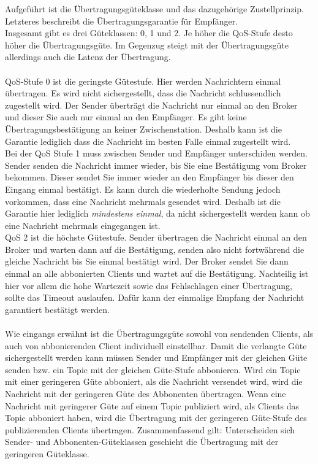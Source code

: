 \documentclass[11pt,a4paper]{report}
\begin{document}
Aufgeführt ist die Übertragungsgüteklasse und das dazugehörige Zustellprinzip.
Letzteres beschreibt die Übertragungsgarantie für Empfänger.
\\
Insgesamt gibt es drei Güteklassen: 0, 1 und 2.
Je höher die QoS-Stufe desto höher die Übertragungsgüte.
Im Gegenzug steigt mit der Übertragungsgüte allerdings auch die Latenz der Übertragung.
\\\\
QoS-Stufe 0 ist die geringste Gütestufe.
Hier werden Nachrichtern einmal übertragen.
Es wird nicht sichergestellt, dass die Nachricht schlussendlich zugestellt wird. 
Der Sender überträgt die Nachricht nur einmal an den Broker und dieser Sie auch nur einmal an den Empfänger.
Es gibt keine Übertragungsbestätigung an keiner Zwischenstation.
Deshalb kann ist die Garantie lediglich dass die Nachricht im besten Falle einmal zugestellt wird.
\\
Bei der QoS Stufe 1 muss zwischen Sender und Empfänger unterschiden werden.
Sender senden die Nachricht immer wieder, bis Sie eine Bestätigung vom Broker bekommen.
Dieser sendet Sie immer wieder an den Empfänger bis dieser den Eingang einmal bestätigt.
Es kann durch die wiederholte Sendung jedoch vorkommen, dass eine Nachricht mehrmals gesendet wird.
Deshalb ist die Garantie hier lediglich \textit{mindestens einmal}, da nicht sichergestellt werden kann ob eine Nachricht mehrmals eingegangen ist.
\\
QoS 2 ist die höchste Gütestufe.
Sender übertragen die Nachricht einmal an den Broker und warten dann auf die Bestätigung, senden also nicht fortwährend die gleiche Nachricht bis Sie einmal bestätigt wird.
Der Broker sendet Sie dann einmal an alle abbonierten Clients und wartet auf die Bestätigung.
Nachteilig ist hier vor allem die hohe Wartezeit sowie das Fehlschlagen einer Übertragung, sollte das Timeout auslaufen.
Dafür kann der einmalige Empfang der Nachricht garantiert bestätigt werden.
\\\\
Wie eingangs erwähnt ist die Übertragungsgüte sowohl von sendenden Clients, als auch von abbonierenden Client individuell einstellbar.
Damit die verlangte Güte sichergestellt werden kann müssen Sender und Empfänger mit der gleichen Güte senden bzw. ein Topic mit der gleichen Güte-Stufe abbonieren.
Wird ein Topic mit einer geringeren Güte abboniert, als die Nachricht versendet wird, wird die Nachricht mit der geringeren Güte des Abbonenten übertragen.
Wenn eine Nachricht mit geringerer Güte auf einem Topic publiziert wird, als Clients das Topic abboniert haben, wird die Übertragung mit der geringeren Güte-Stufe des publizierenden Clients übertragen.
Zusammenfassend gilt: Unterscheiden sich Sender- und Abbonenten-Güteklassen geschieht die Übertragung mit der geringeren Güteklasse.
\end{document}
